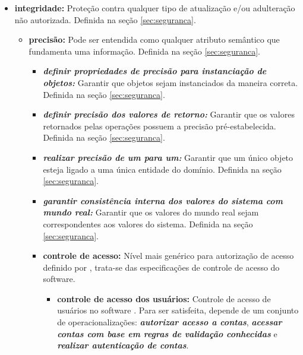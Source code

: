 \begin{itemize}
	
	\item \textbf{integridade:} Proteção contra qualquer tipo de atualização e/ou adulteração não autorizada. Definida na seção \ref{sec:seguranca}.
	
	\begin{itemize}
		
		\item \textbf{precisão:} Pode ser entendida como qualquer atributo semântico que fundamenta uma informação. Definida na seção \ref{sec:seguranca}.
		
		\begin{itemize}
			
			\item \textbf{\textit{definir propriedades de precisão para instanciação de objetos:}} Garantir que objetos sejam instanciados da maneira correta. Definida na seção \ref{sec:seguranca}.
			
			\item \textbf{\textit{definir precisão dos valores de retorno:}} Garantir que os valores retornados pelas operações possuem a precisão pré-estabelecida. Definida na seção \ref{sec:seguranca}.
			
			\item \textbf{\textit{realizar precisão de um para um:}} Garantir que um único objeto esteja ligado a uma única entidade do domínio. Definida na seção \ref{sec:seguranca}.
			
			\item \textbf{\textit{garantir consistência interna dos valores do sistema com mundo real:}} Garantir que os valores do mundo real sejam correspondentes aos valores do sistema. Definida na seção \ref{sec:seguranca}.
			
			\item \textbf{controle de acesso:} Nível mais genérico para autorização de acesso definido por \cite{chung2012non}, trata-se das especificações de controle de acesso do software. 
			
			\begin{itemize}
				
				\item \textbf{controle de acesso dos usuários:} Controle de acesso de usuários no software \cite{chung2012non}. Para ser satisfeita, depende de um conjunto de operacionalizações: \textbf{\textit{autorizar acesso a contas}}, \textbf{\textit{acessar contas com base em regras de validação conhecidas}} e \textbf{\textit{realizar autenticação de contas}}.
				

\end{itemize}
\end{itemize}
\end{itemize}
\end{itemize}
